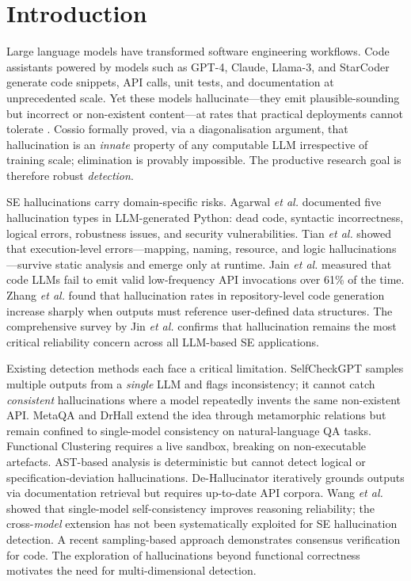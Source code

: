 \documentclass{svproc}
\newcommand{\etal}{\textit{et al.}}
\begin{document}
\section{Introduction}\label{sec:intro}

Large language models have transformed software engineering workflows. Code assistants powered by models such as GPT-4, Claude, Llama-3, and StarCoder generate code snippets, API calls, unit tests, and documentation at unprecedented scale. Yet these models hallucinate---they emit plausible-sounding but incorrect or non-existent content---at rates that practical deployments cannot tolerate \cite{huang2025survey,cossio2025taxonomy}. Cossio \cite{cossio2025taxonomy} formally proved, via a diagonalisation argument, that hallucination is an \emph{innate} property of any computable LLM irrespective of training scale; elimination is provably impossible. The productive research goal is therefore robust \emph{detection}.

SE hallucinations carry domain-specific risks. Agarwal \etal \cite{agarwal2025codemirage} documented five hallucination types in LLM-generated Python: dead code, syntactic incorrectness, logical errors, robustness issues, and security vulnerabilities. Tian \etal \cite{tian2025codehalu} showed that execution-level errors---mapping, naming, resource, and logic hallucinations---survive static analysis and emerge only at runtime. Jain \etal \cite{jain2025codeapi} measured that code LLMs fail to emit valid low-frequency API invocations over 61\% of the time. Zhang \etal \cite{zhang2025llmhallucinations} found that hallucination rates in repository-level code generation increase sharply when outputs must reference user-defined data structures. The comprehensive survey by Jin \etal \cite{jin2025llmsurvey} confirms that hallucination remains the most critical reliability concern across all LLM-based SE applications.

Existing detection methods each face a critical limitation. SelfCheckGPT \cite{manakul2023selfcheckgpt} samples multiple outputs from a \emph{single} LLM and flags inconsistency; it cannot catch \emph{consistent} hallucinations where a model repeatedly invents the same non-existent API. MetaQA \cite{yang2025metaqa} and DrHall \cite{wu2025drhall} extend the idea through metamorphic relations but remain confined to single-model consistency on natural-language QA tasks. Functional Clustering \cite{ravuri2025clustering} requires a live sandbox, breaking on non-executable artefacts. AST-based analysis \cite{khati2026ast} is deterministic but cannot detect logical or specification-deviation hallucinations. De-Hallucinator \cite{eghbali2024dehallucinator} iteratively grounds outputs via documentation retrieval but requires up-to-date API corpora. Wang \etal \cite{wang2023selfconsistency} showed that single-model self-consistency improves reasoning reliability; the cross-\emph{model} extension has not been systematically exploited for SE hallucination detection. A recent sampling-based approach \cite{sun2025sampling} demonstrates consensus verification for code. The exploration of hallucinations beyond functional correctness motivates the need for multi-dimensional detection.
\end{document}
